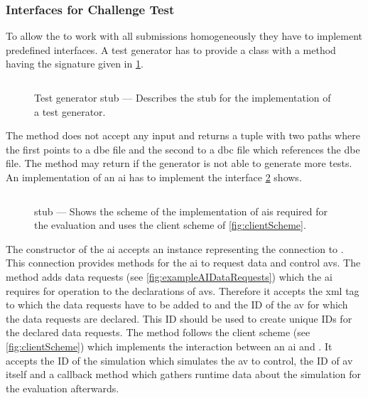 \subsubsection{Interfaces for Challenge Test}
To allow the \submissiontester{} to work with all submissions homogeneously they have to implement predefined interfaces.
A test generator has to provide a class with a method having the signature given in \cref{fig:testGeneratorStub}.
\begin{figure}
    \captionsetup{type=listing}
    \inputminted{python}{code/testGeneratorStub.py}
    \medskip
    \caption{%
        Test generator stub --- Describes the stub for the implementation of a test generator.
    }\label{fig:testGeneratorStub}
\end{figure}
The method  does not accept any input and returns a tuple with two paths where the first points to a \gls{dbe} file and the second to a \gls{dbc} file which references the \gls{dbe} file. %
The method may return  if the generator is not able to generate more tests.\\
An implementation of an \gls{ai} has to implement the interface \cref{fig:aiStub} shows.
\begin{figure}
    \captionsetup{type=listing}
    \inputminted{python}{code/aiStub.py}
    \medskip
    \caption{%
         stub --- Shows the scheme of the implementation of \glspl{ai} required for the evaluation and uses the client scheme of \cref{fig:clientScheme}.
    }\label{fig:aiStub}
\end{figure}
The constructor of the \gls{ai} accepts an instance representing the connection to \drivebuild{}.
This connection provides methods for the \gls{ai} to request data and control \glspl{av}.
The method  adds data requests (see \cref{fig:exampleAIDataRequests}) which the \gls{ai} requires for operation to the declarations of \glspl{av}. %
Therefore it accepts the \gls{xml} tag to which the data requests have to be added to and the ID of the \gls{av} for which the data requests are declared.
This ID should be used to create unique IDs for the declared data requests.
The method  follows the client scheme (see \cref{fig:clientScheme}) which implements the interaction between an \gls{ai} and \drivebuild{}. %
It accepts the ID of the simulation which simulates the \gls{av} to control, the ID of \gls{av} itself and a callback method which gathers runtime data about the simulation for the evaluation afterwards.

